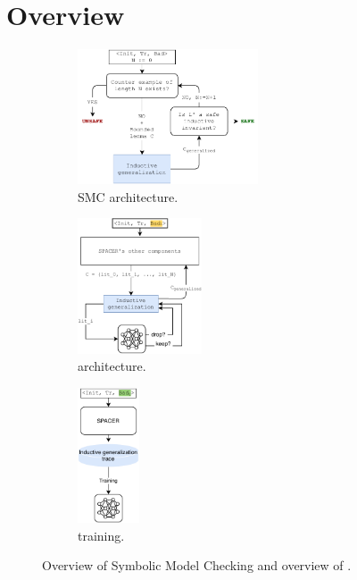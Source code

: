 \section{Overview}
\label{sec:overview}
\begin{figure}[t]
  \centering
  \begin{subfigure}[b]{0.4\textwidth}
  \centering
    \includegraphics[height=4cm]{figures/doping-spacer}
    \caption{SMC architecture.}
    \label{fig:smc}
  \end{subfigure}
  \begin{subfigure}[b]{0.31\textwidth}
    \centering
    \includegraphics[height=4cm]{figures/doping-Page-general_architecture.pdf}
    \caption{\dpy architecture.}
    \label{fig:dopey}
	\end{subfigure}
  \begin{subfigure}[b]{0.15\textwidth}
  \centering
    \includegraphics[height=4cm]{figures/doping-training.pdf}
    \caption{\dpy training.}
    \label{fig:spc_train}
	\end{subfigure}
	\caption{Overview of Symbolic Model Checking and overview of \dpy.}
  \label{fig:overview}
\end{figure}


